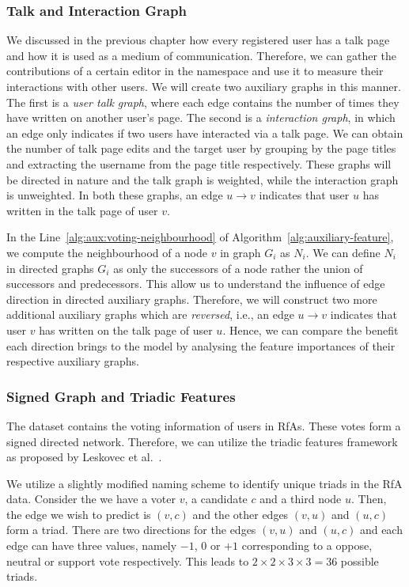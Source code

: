 \subsubsection{Talk and Interaction Graph}
\label{subsec:talk-interaction-graph}
We discussed in the previous chapter how every registered user has a talk page and how it is used as a medium of communication. 
Therefore, we can gather the contributions of a certain editor in the \usertalkNS namespace and use it to measure their interactions with other users.
We will create two auxiliary graphs in this manner.
The first is a \textit{user talk graph}, where each edge contains the number of times they have written on another user's page.
The second is a \textit{interaction graph}, in which an edge only indicates if two users have interacted via a talk page. 
We can obtain the number of talk page edits and the target user by grouping by the page titles and extracting the username from the page title respectively. 
These graphs will be directed in nature and the talk graph is weighted, while the interaction graph is unweighted. 
In both these graphs, an edge $u \rightarrow v$ indicates that user $u$ has written in the talk page of user $v$.

In the Line~\ref{alg:aux:voting-neighbourhood} of Algorithm~\ref{alg:auxiliary-feature}, we compute the neighbourhood of a node $v$ in graph $G_i$ as $N_i$.
We can define $N_i$ in directed graphs $G_i$ as only the successors of a node rather the union of successors and predecessors.
This allow us to understand the influence of edge direction in directed auxiliary graphs.
Therefore, we will construct two more additional auxiliary graphs which are \textit{reversed}, i.e., an edge $u \rightarrow v$ indicates that user $v$ has written on the talk page of user $u$.
Hence, we can compare the benefit each direction brings to the model by analysing the feature importances of their respective auxiliary graphs.

\subsubsection{Signed Graph and Triadic Features}
The \wikirfa dataset contains the voting information of users in RfAs.
These votes form a signed directed network.
Therefore, we can utilize the triadic features framework as proposed by Leskovec et al.\ \cite{leskovec2010predicting}.

We utilize a slightly modified naming scheme to identify unique triads in the RfA data.
Consider the we have a voter $v$, a candidate $c$ and a third node $u$.
Then, the edge we wish to predict is $(v,c)$ and the other edges $(v,u)$ and $(u,c)$ form a triad.
There are two directions for the edges $(v,u)$ and $(u,c)$ and each edge can have three values, namely $-1$, $0$ or $+1$ corresponding to a oppose, neutral or support vote respectively.
This leads to $2 \times 2 \times 3 \times 3 = 36$ possible triads.

